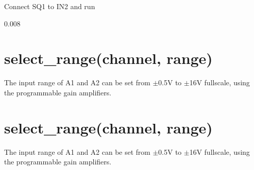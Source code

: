 \documentclass[a4paper,12pt,english]{sphinxmanual}
\begin{document}
Connect SQ1 to IN2 and run

\begin{sphinxVerbatim}[commandchars=\\\{\}]
  
\end{sphinxVerbatim}

0.008


\section{select\_range(channel, range)}
\label{\detokenize{9.0:select-range-channel-range}}
The input range of A1 and A2 can be set from \(\pm\)0.5V to \(\pm\)16V
fullscale, using the programmable gain amplifiers.

\begin{sphinxVerbatim}[commandchars=\\\{\}]
          
          
\end{sphinxVerbatim}


\section{select\_range(channel, range)}
\label{\detokenize{9.0:id1}}
The input range of A1 and A2 can be set from \(\pm\)0.5V to \(\pm\)16V
fullscale, using the programmable gain amplifiers.

\begin{sphinxVerbatim}[commandchars=\\\{\}]
          
          
\end{sphinxVerbatim}
\end{document}
